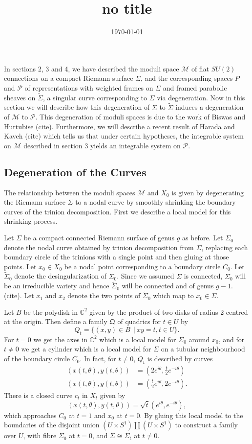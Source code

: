 \documentclass[]{article}
\title{no title}
\date{\today}
\newcommand{\C}{\mathbb{C}}
\newcommand{\MM}{\mathcal{M}}
\newcommand{\cP}{\mathcal{P}}
\newcommand{\QQ}{\mathfrak{Q}}
\begin{document}
	In sections 2, 3 and 4, we have described the moduli space $\MM$ of flat $SU(2)$ connections on a compact Riemann surface $\Sigma$, and the corresponding spaces $P$ and $\cP$ of representations with weighted frames on $\Sigma$ and framed parabolic sheaves on $\tilde{\Sigma}$, a singular curve corresponding to $\Sigma$ via degeneration. Now in this section we will describe how this degeneration of $\Sigma$ to $\tilde{\Sigma}$ induces a degeneration of $\MM$ to $\cP$. This degeneration of moduli spaces is due to the work of Biswas and Hurtubise (cite). Furthermore, we will describe a recent result of Harada and Kaveh (cite) which tells us that under certain hypotheses, the integrable system on $\MM$ described in section 3 yields an integrable system on $\cP$.
\subsection{Degeneration of the Curves}
	The relationship between the moduli spaces $\MM$ and $X_0$ is given by degenerating the Riemann surface $\Sigma$ to a nodal curve by smoothly shrinking the boundary curves of the trinion decomposition. First we describe a local model for this shrinking process.
	
	Let $\Sigma$ be a compact connected Riemann surface of genus $g$ as before. Let $\Sigma_0$ denote the nodal curve obtained by trinion decomposition from $\Sigma$, replacing each boundary circle of the trinions with a single point and then gluing at those points. Let $x_0 \in X_0$ be a nodal point corresponding to a boundary circle $C_0$. Let $\tilde{\Sigma}_0$ denote the desingularization of $\Sigma_0$. Since we assumed $\Sigma$ is connected, $\Sigma_0$ will be an irreducible variety and hence $\tilde{\Sigma}_0$ will be connected and of genus $g-1$. (cite). Let $x_1$ and $x_2$ denote the two points of $\tilde{\Sigma}_0$ which map to $x_0 \in \Sigma$. 
	
	Let $B$ be the polydisk in $\C^2$ given by the product of two disks of radius 2 centred at the origin. Then define a family $\QQ$ of quadrics for $t\in U$ by 
	\begin{equation}
		Q_t = \{(x,y)\in B\ ~|~ xy = t, t\in U\}.
	\end{equation}
	For $t=0$ we get the axes in $\C^2$ which is a local model for $\Sigma_0$ around $x_0$, and for $t \neq 0$ we get a cylinder which is a local model for $\Sigma$ on a tubular neighbourhood of the boundary circle $C_0$. In fact, for $t\neq 0$, $Q_t$ is described by curves
	\begin{align*}
		(x(t,\theta), y(t, \theta)) &= \left(
		2e^{i\theta}, \frac{t}{2}e^{-i\theta}
		\right)\\
		(x(t,\theta), y(t, \theta)) &= \left(
		\frac{t}{2}e^{i\theta}, 2e^{-i\theta}
		\right).
	\end{align*}
	There is a closed curve $c_t$ in $X_t$ given by
	\begin{equation}
		(x(t,\theta), y(t,\theta)) = \sqrt{t}(e^{i\theta}, e^{-i\theta}),
	\end{equation}
	which approaches $C_0$ at $t=1$ and $x_0$ at $t=0$. By gluing this local model to the boundaries of the disjoint union $(U\times S^1)\coprod (U\times S^1)$ to construct a family over $U$, with fibre $\Sigma_0$ at $t=0$, and $\Sigma \cong \Sigma_t$ at $t\neq 0$.
\end{document}
